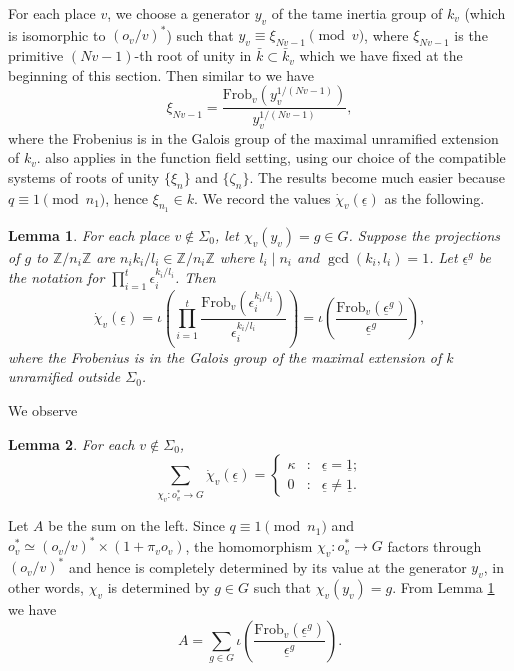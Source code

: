 \documentclass[12pt]{amsart}
\theoremstyle{plain}
\newtheorem{lemma}{Lemma}
\begin{document}
For each place $v$, we choose a generator $y_v$ of the tame inertia group of $k_v$ (which is isomorphic to $(o_v/v)^*$) such that $y_v \equiv \xi_{Nv-1} \pmod{v}$, where $\xi_{Nv-1}$ is the primitive $(Nv-1)$-th root of unity in $\bar{k} \subset \bar{k}_v$ which we have fixed at the beginning of this section. Then similar to \cite[Lemma 2.15]{woo} we have
\[\xi_{Nv-1}=\frac{{\mathrm{Frob}}_v\left(y_v^{1/(Nv-1)}
\right)}{y_v^{1/(Nv-1)}}, \]
where the Frobenius is in the Galois group of the maximal unramified extension of $k_v$. \cite[Lemma 2.16]{woo} also applies in the function field setting, using our choice of the compatible systems of roots of unity $\{\xi_n\}$ and $\{\zeta_n\}$. The results become much easier because $q \equiv 1 \pmod{n_1}$, hence $\xi_{n_1} \in k$. We record the values $\dot{\chi}_v({\underline{{\epsilon}}})$ as the following.
\begin{lemma} \label{3:chi}
For each place $v \notin \Sigma_0$, let $\chi_v(y_v)=g \in G$. Suppose the projections of $g$ to ${{\mathbb Z}}/n_i{{\mathbb Z}}$ are $n_ik_i/l_i \in {{\mathbb Z}}/n_i{{\mathbb Z}}$ where $l_i \mid n_i$ and $\gcd(k_i,l_i)=1$. Let ${\underline{{\epsilon}}}^g$ be the notation for $\prod_{i=1}^t \epsilon_i^{k_i/l_i}$. Then
\[\dot{\chi}_v({\underline{{\epsilon}}})=\iota\left(\prod_{i=1}^{t}
\frac{{\mathrm{Frob}}_v\left(\epsilon_i^{k_i/l_i}\right)}{\epsilon_i^{k_i/l_i}}\right)
=\iota\left(\frac{{\mathrm{Frob}}_v\left({\underline{{\epsilon}}}^g\right)}{{\underline{{\epsilon}}}^g}\right),\]
where the Frobenius is in the Galois group of the maximal extension of $k$ unramified outside $\Sigma_0$.
\end{lemma}
We observe
\begin{lemma} \label{3:chi2} For each $v \notin \Sigma_0$,
\[\sum_{\chi_v: o_v^* \to G} \dot{\chi}_v({\underline{{\epsilon}}})=
 \left\{\begin{array}{ccc}
 \kappa&:& {\underline{{\epsilon}}}={\underline{{1}}}; \\
 0&:& {\underline{{\epsilon}}} \ne {\underline{{1}}}. \end{array}\right.\]
\end{lemma}
 Let $A$ be the sum on the left. Since $q \equiv 1 \pmod{n_1}$ and $o_v^* \simeq (o_v/v)^*  \times \left(1+\pi_v o_v\right)$, the homomorphism $\chi_v: o_v^* \to G$ factors through $(o_v/v)^*$ and hence is completely determined by its value at the generator $y_v$, in other words, $\chi_v$ is determined by $g \in G$ such that $\chi_v(y_v)=g$. From Lemma \ref{3:chi} we have
\[A=\sum_{g \in G} \iota\left(\frac{{\mathrm{Frob}}_v\left({\underline{{\epsilon}}}^g\right)}{{\underline{{\epsilon}}}^g}\right). \]
\end{document}
